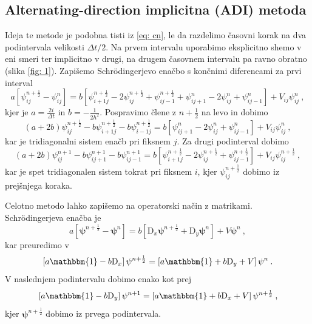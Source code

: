\documentclass[11pt]{report}
\newcommand{\D}{\text{D}}
\newcommand{\vpsin}{\mathbf{\psi}^n}
\newcommand{\vpsinh}{\mathbf{\psi}^{n+\frac{1}{2}}}
\newcommand{\vpsinn}{\mathbf{\psi}^{n+1}}
\newcommand{\I}{\mathbbm{1}}
\begin{document}
\subsection{Alternating-direction implicitna (ADI) metoda}
Ideja te metode je podobna tisti iz \ref{eq: cn}, le da razdelimo časovni korak na dva podintervala velikosti
$\Delta t /2$. Na prvem intervalu uporabimo eksplicitno shemo v eni smeri ter implicitno v drugi, na drugem časovnem
intervalu pa ravno obratno (slika \ref{fig: 1}). Zapišemo Schr\" odingerjevo enačbo s končnimi diferencami
za prvi interval
\begin{equation}
	\label{eq: adi0}
	a \left [ \psi^{n+\frac{1}{2}}_{ij} - \psi_{ij}^n \right ] = b \left [ \psi^{n+\frac{1}{2}}_{i+1j} -
		2\psi^{n+\frac{1}{2}}_{ij} + \psi^{n+\frac{1}{2}}_{ij-1} + \psi_{ij+1}^n - 2\psi_{ij}^n + \psi_{ij-1}^n \right ] + V_{ij} \psi_{ij}^n \>,
\end{equation}
kjer je $a=\frac{2i}{\Delta t}$ in $b=-\frac{1}{2h^2}$. Pospravimo člene z $n+\frac{1}{2}$ na levo in dobimo
\begin{equation}
	\label{eq: adi1}
	(a + 2b) \psi^{n+\frac{1}{2}}_{ij} - b \psi^{n+\frac{1}{2}}_{i+1j} - b \psi^{n+\frac{1}{2}}_{i-1j} =
	b \left [ \psi_{ij+1}^n - 2 \psi_{ij}^n + \psi_{ij-1}^n  \right ] + V_{ij} \psi_{ij}^n \>,
\end{equation}
kar je tridiagonalni sistem enačb pri fiksnem $j$. Za drugi podinterval dobimo
\begin{equation}
	\label{eq: adi2}
	(a + 2b) \psi^{n+1}_{ij} - b \psi^{n+1}_{ij+1} - b \psi^{n+1}_{ij-1} =
	b \left [ \psi^{n+\frac{1}{2}}_{i+1j}- 2 \psi^{n+\frac{1}{2}}_{ij} + \psi^{n+\frac{1}{2}}_{ij-1}  \right ] +
	V_{ij} \psi^{n+\frac{1}{2}}_{ij} \>,
\end{equation}
kar je spet tridiagonalen sistem tokrat pri fiksnem $i$, kjer $\psi^{n+\frac{1}{2}}_{ij}$ dobimo iz prejšnjega koraka.

Celotno metodo lahko zapišemo na operatorski način z matrikami. Schr\" odingerjeva enačba je
\begin{equation}
	a \left [ \vpsinh - \vpsin \right ] = b \left [ \D_x \vpsinh + \D_y \vpsin \right ] + V\vpsin \>,
\end{equation}
kar preuredimo v
\begin{equation}
	\label{eq: sparse adi1}
	\left [ a \I - b \D_x  \right ] \vpsinh = \left [ a \I + b \D_y + V \right ] \vpsin \>.
\end{equation}
V naslednjem podintervalu dobimo enako kot prej
\begin{equation}
	\label{eq: sparse adi2}
	\left [ a \I - b \D_y  \right ] \vpsinn = \left [ a \I + b \D_x + V \right ] \vpsinh \>,
\end{equation}
kjer $\vpsinh$ dobimo iz prvega podintervala.
\end{document}
